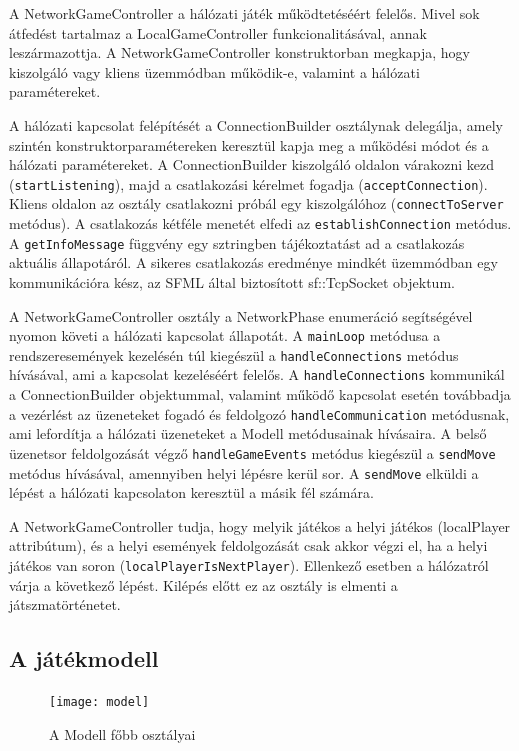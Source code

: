 \documentclass[12pt, twoside]{report}
\begin{document}
A NetworkGameController a hálózati játék működtetéséért felelős. Mivel sok átfedést tartalmaz a LocalGameController funkcionalitásával, annak leszármazottja. A NetworkGameController konstruktorban megkapja, hogy kiszolgáló vagy kliens üzemmódban működik-e, valamint a hálózati paramétereket. 

A hálózati kapcsolat felépítését a ConnectionBuilder osztálynak delegálja, amely szintén konstruktorparamétereken keresztül kapja meg a működési módot és a hálózati paramétereket. A ConnectionBuilder kiszolgáló oldalon várakozni kezd \break ({\tt startListening}), majd a csatlakozási kérelmet fogadja ({\tt acceptConnection}). Kliens oldalon az osztály csatlakozni próbál egy kiszolgálóhoz ({\tt connectToServer} metódus). A csatlakozás kétféle menetét elfedi az {\tt establishConnection} metódus. A {\tt getInfoMessage} függvény egy sztringben tájékoztatást ad a csatlakozás aktuális állapotáról. A sikeres csatlakozás eredménye mindkét üzemmódban egy kommunikációra kész, az SFML által biztosított sf::TcpSocket objektum.

A NetworkGameController osztály a NetworkPhase enumeráció segítségével nyomon követi a hálózati kapcsolat állapotát. A {\tt mainLoop} metódusa a rendszeresemények kezelésén túl kiegészül a {\tt handleConnections} metódus hívásával, ami a kapcsolat kezeléséért felelős. A {\tt handleConnections} kommunikál a ConnectionBuilder objektummal, valamint működő kapcsolat esetén továbbadja a vezérlést az üzeneteket fogadó és feldolgozó {\tt handleCommunication} metódusnak, ami lefordítja a hálózati üzeneteket a Modell metódusainak hívásaira. A belső üzenetsor feldolgozását végző {\tt handleGameEvents} metódus kiegészül a {\tt sendMove} metódus hívásával, amennyiben helyi lépésre kerül sor. A {\tt sendMove} elküldi a lépést a hálózati kapcsolaton keresztül a másik fél számára. 

A NetworkGameController tudja, hogy melyik játékos a helyi játékos (localPlayer attribútum), és a helyi események feldolgozását csak akkor végzi el, ha a helyi játékos van soron ({\tt localPlayerIsNextPlayer}). Ellenkező esetben a hálózatról várja a következő lépést. Kilépés előtt ez az osztály is elmenti a játszmatörténetet.

\subsection {A játékmodell}

\begin{figure}[h]
	\begin{center}
		\texttt{[image: model]}
	\end{center}
	\caption{A Modell főbb osztályai}
\end{figure}
\end{document}
